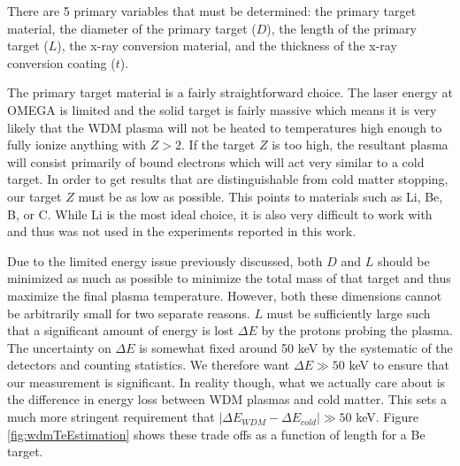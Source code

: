 There are 5 primary variables that must be determined: the primary target material, the diameter of the primary target ($D$), the length of the primary target ($L$), the x-ray conversion material, and the thickness of the x-ray conversion coating ($t$). 

The primary target material is a fairly straightforward choice. The laser energy at OMEGA is limited and the solid target is fairly massive which means it is very likely that the WDM plasma will not be heated to temperatures high enough to fully ionize anything with $Z>2$. If the target $Z$ is too high, the resultant plasma will consist primarily of bound electrons which will act very similar to a cold target. In order to get results that are distinguishable from cold matter stopping, our target $Z$ must be as low as possible. This points to materials such as Li, Be, B, or C. While Li is the most ideal choice, it is also very difficult to work with and thus was not used in the experiments reported in this work.

Due to the limited energy issue previously discussed, both $D$ and $L$ should be minimized as much as possible to minimize the total mass of that target and thus maximize the final plasma temperature. However, both these dimensions cannot be arbitrarily small for two separate reasons. $L$ must be sufficiently large such that a significant amount of energy is lost $\Delta E$ by the protons probing the plasma. The uncertainty on $\Delta E$ is somewhat fixed around 50 keV by the systematic of the detectors and counting statistics. We therefore want $\Delta E \gg 50$ keV to ensure that our measurement is significant. In reality though, what we actually care about is the difference in energy loss between WDM plasmas and cold matter. This sets a much more stringent requirement that $|\Delta E_{WDM} - \Delta E_{cold}| \gg 50$ keV. Figure \ref{fig:wdmTeEstimation} shows these trade offs as a function of length for a Be target. 

